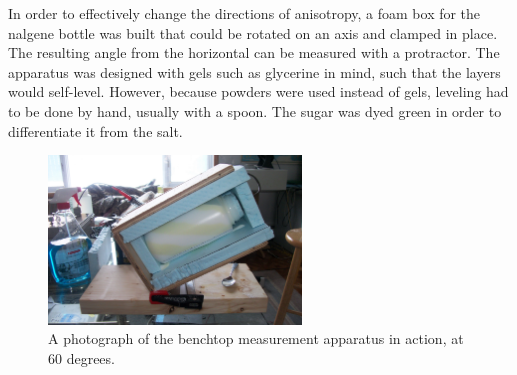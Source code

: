 In order to effectively change the directions of anisotropy, a foam box for the
nalgene bottle was built that could be rotated on an axis and clamped in place.
The resulting angle from the horizontal can be measured with a protractor. The apparatus was designed with gels such as glycerine in mind, such that the layers
would self-level. However, because powders were used instead of gels, leveling
had to be done by hand, usually with a spoon. The sugar was dyed green in order
 to differentiate it from the salt.

\begin{figure}[h]
\centering
\includegraphics[width=0.6\textwidth]{fig/tilter_irl.jpg}
\caption{A photograph of the benchtop measurement apparatus in action, at 60 degrees.}
\label{fig:tilter}
\end{figure}
